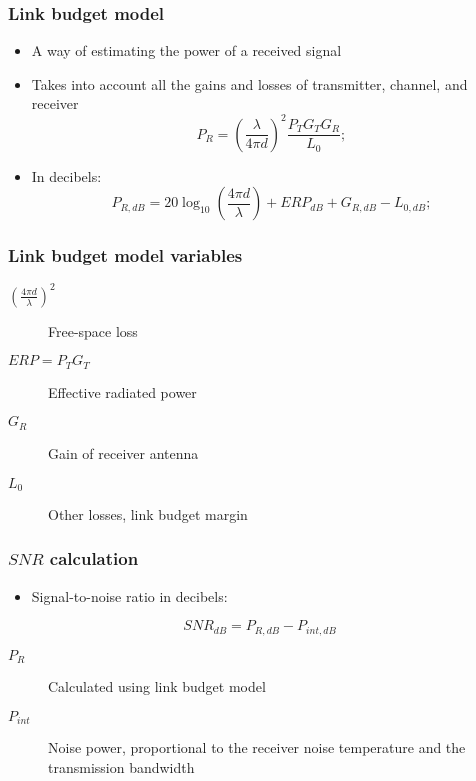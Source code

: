 \documentclass{beamer}
\begin{document}
\begin{frame}
	\frametitle{Link budget model}
	\begin{itemize}
		\item A way of estimating the power of a received signal
		\item Takes into account all the gains and losses of transmitter, channel, and receiver
		\begin{equation}
			P_R = \left(\frac{\lambda}{4 \pi d}\right)^2 \frac{P_T G_T G_R}{L_0};
		\end{equation}
		\item In decibels:
		\begin{equation}
			P_{R, dB} = 20\log_{10}\left(\frac{4 \pi d}{\lambda}\right) + {ERP}_{dB} + G_{R, dB} - L_{0, dB};
		\end{equation}
	\end{itemize}
\end{frame}

\begin{frame}
	\frametitle{Link budget model variables}
	\begin{description}
		\item[$(\frac{4 \pi d}{\lambda})^2$] Free-space loss
		\item[$ERP = P_T G_T$] Effective radiated power
		\item[$G_R$] Gain of receiver antenna
		\item[$L_0$] Other losses, link budget margin
	\end{description}
\end{frame}

\begin{frame}
	\frametitle{$SNR$ calculation}
	\begin{itemize}
		\item Signal-to-noise ratio in decibels:
	\end{itemize}
	\begin{equation}
		{SNR}_{dB} = P_{R, dB} - P_{int, dB}
	\end{equation}
	\begin{description}
		\item[$P_R$] Calculated using link budget model
		\item[$P_{int}$] Noise power, proportional to the receiver noise temperature and the transmission bandwidth
	\end{description}
\end{frame}
\end{document}
